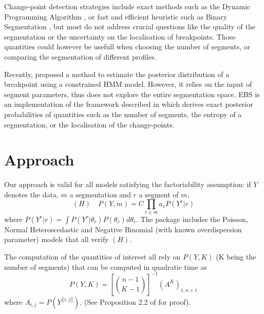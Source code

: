 \documentclass{bioinfo}
\begin{document}
Change-point detection strategies include exact methods such as the Dynamic Programming Algorithm \citep{bellman_approximation_1961}, or fast and efficient heuristic such as Binary Segmentation \citep{breiman_cart}, but most do not address crucial questions like the quality of the segmentation or the uncertainty on the localisation of breakpoints. Those quantities could however be usefull when choosing the number of segments, or comparing the segmentation of different profiles. 

Recently, \cite{Luong_HMM_2012} proposed a method to estimate the posterior distribution of a breakpoint using a constrained HMM model. However, it relies on the input of segment parameters, thus does not explore the entire segmentation space. EBS is an implementation of the framework described in \cite{rigaill_exact_2011} which derives exact posterior probabilities of quantities such as the number of segments, the entropy of a segmentation, or the localisation of the change-points.



\section{Approach}

Our approach is valid for all models satisfying the factoriability assumption: if $Y$ denotes the data, $m$ a segmentation and $r$ a segment of $m$, 
\begin{equation}
 (H)\quad P(Y,m) = C \prod_{r\in m} a_r P(Y^r|r) \label{factoriability}
\end{equation}
where $P(Y^r|r) =\int P(Y^r|\theta_r)P(\theta_r)d\theta_r $. The package includes the Poisson, Normal Heteroscedastic and Negative Binomial (with known overdispersion parameter) models that all verify $(H)$.

The computation of the quantities of interest all rely on $P(Y,K)$ (K being the number of segments) that can be computed in quadratic time as
\begin{equation}
 P(Y,K) = \left[{n-1} \choose{K-1} \right]^{-1} \left(A^K \right)_{1,n+1} \label{Proba}
\end{equation} 
where $A_{i,j}=P(Y^{[\![i,j[\![})$. (See Proposition 2.2 of \cite{rigaill_exact_2011} for proof).
\end{document}
